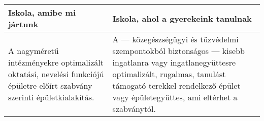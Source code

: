 \begin{longtable}[]{@{}ll@{}}
\toprule
\begin{minipage}[b]{0.33\columnwidth}\raggedright
Iskola, amibe mi jártunk\strut
\end{minipage} & \begin{minipage}[b]{0.61\columnwidth}\raggedright
Iskola, ahol a gyerekeink tanulnak\strut
\end{minipage}\tabularnewline
\midrule
\endhead
\begin{minipage}[t]{0.33\columnwidth}\raggedright
A nagyméretű intézményekre optimalizált oktatási, nevelési funkciójú
épületre előírt szabvány szerinti épületkialakítás.\strut
\end{minipage} & \begin{minipage}[t]{0.61\columnwidth}\raggedright
A --- közegészségügyi és tűzvédelmi szempontokból biztonságos --- kisebb
ingatlanra vagy ingatlanegyüttesre optimalizált, rugalmas, tanulást
támogató terekkel rendelkező épület vagy épületegyüttes, ami eltérhet a
szabványtól.\strut
\end{minipage}\tabularnewline
\bottomrule
\end{longtable}
